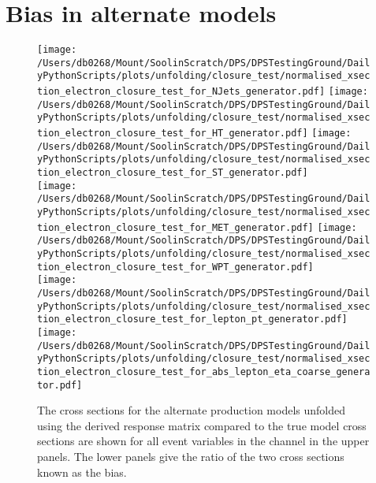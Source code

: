\chapter{Bias in alternate models} %
\label{sec:bias_in_alternate_models}

\begin{figure*}[htpb]
	\centering
	\texttt{[image: /Users/db0268/Mount/SoolinScratch/DPS/DPSTestingGround/DailyPythonScripts/plots/unfolding/closure\_test/normalised\_xsection\_electron\_closure\_test\_for\_NJets\_generator.pdf]} 
	\texttt{[image: /Users/db0268/Mount/SoolinScratch/DPS/DPSTestingGround/DailyPythonScripts/plots/unfolding/closure\_test/normalised\_xsection\_electron\_closure\_test\_for\_HT\_generator.pdf]} 
	\texttt{[image: /Users/db0268/Mount/SoolinScratch/DPS/DPSTestingGround/DailyPythonScripts/plots/unfolding/closure\_test/normalised\_xsection\_electron\_closure\_test\_for\_ST\_generator.pdf]} \\
	\texttt{[image: /Users/db0268/Mount/SoolinScratch/DPS/DPSTestingGround/DailyPythonScripts/plots/unfolding/closure\_test/normalised\_xsection\_electron\_closure\_test\_for\_MET\_generator.pdf]} 
	\texttt{[image: /Users/db0268/Mount/SoolinScratch/DPS/DPSTestingGround/DailyPythonScripts/plots/unfolding/closure\_test/normalised\_xsection\_electron\_closure\_test\_for\_WPT\_generator.pdf]} \\
	\texttt{[image: /Users/db0268/Mount/SoolinScratch/DPS/DPSTestingGround/DailyPythonScripts/plots/unfolding/closure\_test/normalised\_xsection\_electron\_closure\_test\_for\_lepton\_pt\_generator.pdf]} 
	\texttt{[image: /Users/db0268/Mount/SoolinScratch/DPS/DPSTestingGround/DailyPythonScripts/plots/unfolding/closure\_test/normalised\_xsection\_electron\_closure\_test\_for\_abs\_lepton\_eta\_coarse\_generator.pdf]} \\
	\caption[The cross sections for the alternate \ttbar{} production models unfolded using the \powhegpythia{} derived response matrix compared to the true model cross sections are shown for all event variables in the \eJets{} channel in the upper panels. The lower panels give the ratio of the two cross sections known as the bias.]{The cross sections for the alternate \ttbar{} production models unfolded using the \powhegpythia{} derived response matrix compared to the true model cross sections are shown for all event variables in the \eJets{} channel in the upper panels. The lower panels give the ratio of the two cross sections known as the bias.}
	\label{fig:ClosureBiase2}
\end{figure*}
